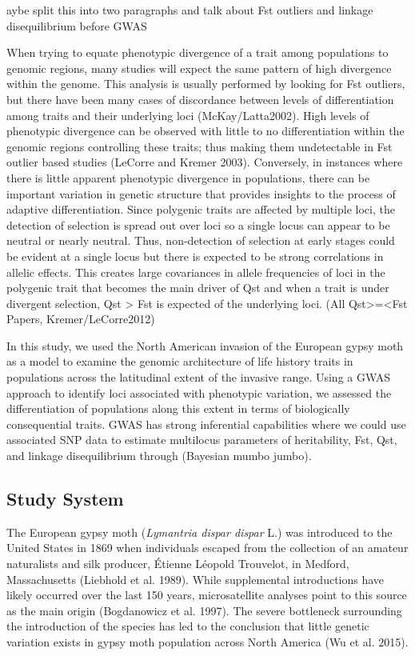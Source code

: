 \documentclass[smallextended]{svjour3}
\begin{document}
^^Maybe split this into two paragraphs and talk about Fst outliers and linkage
disequilibrium before GWAS

When trying to equate phenotypic divergence of a trait among populations to
genomic regions, many studies will expect the same pattern of high divergence
within the genome. This analysis is usually performed by looking for Fst
outliers, but there have been many cases of discordance between levels of
differentiation among traits and their underlying loci (McKay/Latta2002).  High
levels of phenotypic divergence can be observed with little to no
differentiation within the genomic regions controlling these traits; thus making
them undetectable in Fst outlier based studies (LeCorre and Kremer 2003).
Conversely, in instances where there is little apparent phenotypic divergence in
populations, there can be important variation in genetic structure that provides
insights to the process of adaptive differentiation. Since polygenic traits are
affected by multiple loci, the detection of selection is spread out over loci so
a single locus can appear to be neutral or nearly neutral. Thus, non-detection
of selection at early stages could be evident at a single locus but there is
expected to be strong correlations in allelic effects. This creates large
covariances in allele frequencies of loci in the polygenic trait that becomes
the main driver of Qst and when a trait is under divergent selection, Qst > Fst
is expected of the underlying loci. (All Qst>=<Fst Papers, Kremer/LeCorre2012)

In this study, we used the North American invasion of the European gypsy moth as
a model to examine the genomic architecture of life history traits in
populations across the latitudinal extent of the invasive range.  Using a GWAS
approach to identify loci associated with phenotypic variation, we assessed the
differentiation of populations along this extent in terms of biologically
consequential traits. GWAS has strong inferential capabilities where we could
use associated SNP data to estimate multilocus parameters of heritability, Fst,
Qst, and linkage disequilibrium through (Bayesian mumbo jumbo).

\subsection*{Study System}

The European gypsy moth (\textit{Lymantria dispar dispar} L.) was introduced to
the United States in 1869 when individuals escaped from the collection of an
amateur naturalists and silk producer, Étienne Léopold Trouvelot, in Medford,
Massachusetts (Liebhold et al. 1989). While supplemental introductions have
likely occurred over the last 150 years, microsatellite analyses point to this
source as the main origin (Bogdanowicz et al. 1997). The severe bottleneck
surrounding the introduction of the species has led to the conclusion that
little genetic variation exists in gypsy moth population across North America
(Wu et al. 2015).
\end{document}
